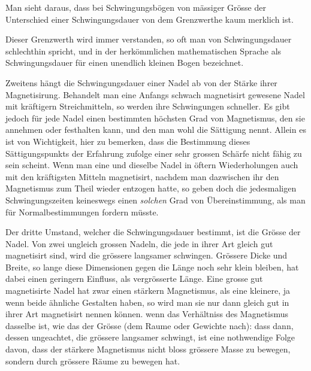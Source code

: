 Man sieht daraus, dass bei Schwingungsbögen von mässiger Grösse der Unterschied einer Schwingungsdauer von dem Grenzwerthe kaum merklich ist.
\par\clearpage
{}
\noindent Dieser Grenzwerth wird immer verstanden, so oft man von Schwingungsdauer schlechthin spricht, und in der herkömmlichen mathematischen Sprache als Schwingungsdauer für einen unendlich kleinen Bogen bezeichnet.

Zweitens hängt die Schwingungsdauer einer Nadel ab von der Stärke ihrer Magnetisirung. Behandelt man eine Anfangs schwach magnetisirt gewesene Nadel mit kräftigern Streichmitteln, so werden ihre Schwingungen schneller. Es gibt jedoch für jede Nadel einen bestimmten höchsten Grad von Magnetismus, den sie annehmen oder festhalten kann, und den man wohl die Sättigung nennt. Allein es ist von Wichtigkeit, hier zu bemerken, dass die Bestimmung dieses Sättigungspunkts der Erfahrung zufolge einer sehr grossen Schärfe nicht fähig zu sein scheint. Wenn man eine und dieselbe Nadel in öftern Wiederholungen auch mit den kräftigsten Mitteln magnetisirt, nachdem man dazwischen ihr den Magnetismus zum Theil wieder entzogen hatte, so geben doch die jedesmaligen Schwingungszeiten keineswegs einen \textit{solchen} Grad von Übereinstimmung, als man für Normalbestimmungen fordern müsste.

Der dritte Umstand, welcher die Schwingungsdauer bestimmt, ist die Grösse der Nadel. Von zwei ungleich grossen Nadeln, die jede in ihrer Art gleich gut magnetisirt sind, wird die grössere langsamer schwingen. Grössere Dicke und Breite, so lange diese Dimensionen gegen die Länge noch sehr klein bleiben, hat dabei einen geringern Einfluss, als vergrösserte Länge. Eine grosse gut magnetisirte Nadel hat zwar einen stärkern Magnetismus, als eine kleinere, ja wenn beide ähnliche Gestalten haben, so wird man sie nur dann gleich gut in ihrer Art magnetisirt nennen können. wenn das Verhältniss des Magnetismus dasselbe ist, wie das der Grösse (dem Raume oder Gewichte nach): dass dann, dessen ungeachtet, die grössere langsamer schwingt, ist eine nothwendige Folge davon, dass der stärkere Magnetismus nicht bloss grössere Masse zu bewegen, sondern durch grössere Räume zu bewegen hat.

